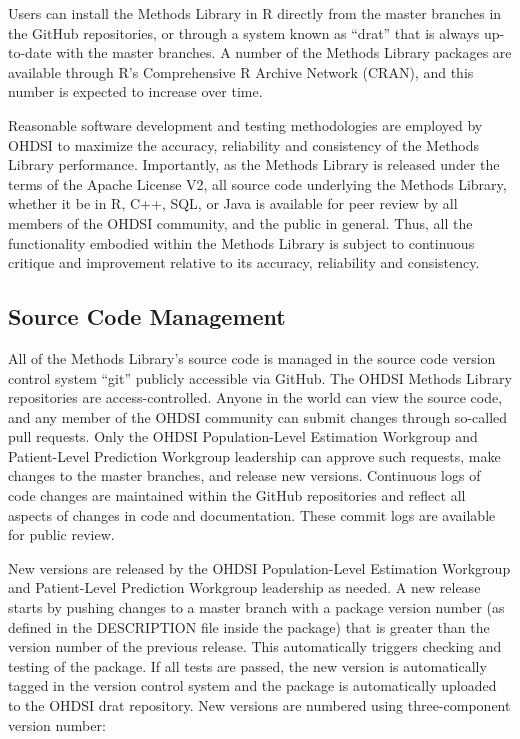 \documentclass[11pt]{book}
\theoremstyle{definition}
\theoremstyle{definition}
\theoremstyle{definition}
\theoremstyle{remark}
\begin{document}
Users can install the Methods Library in R directly from the master branches in the GitHub repositories, or through a system known as ``drat'' that is always up-to-date with the master branches. A number of the Methods Library packages are available through R's Comprehensive R Archive Network (CRAN), and this number is expected to increase over time.

Reasonable software development and testing methodologies are employed by OHDSI to maximize the accuracy, reliability and consistency of the Methods Library performance. Importantly, as the Methods Library is released under the terms of the Apache License V2, all source code underlying the Methods Library, whether it be in R, C++, SQL, or Java is available for peer review by all members of the OHDSI community, and the public in general. Thus, all the functionality embodied within the Methods Library is subject to continuous critique and improvement relative to its accuracy, reliability and consistency.

\hypertarget{source-code-management}{%
\subsection{Source Code Management}\label{source-code-management}}

All of the Methods Library's source code is managed in the source code version control system ``git'' publicly accessible via GitHub. The OHDSI Methods Library repositories are access-controlled. Anyone in the world can view the source code, and any member of the OHDSI community can submit changes through so-called pull requests. Only the OHDSI Population-Level Estimation Workgroup and Patient-Level Prediction Workgroup leadership can approve such requests, make changes to the master branches, and release new versions. Continuous logs of code changes are maintained within the GitHub repositories and reflect all aspects of changes in code and documentation. These commit logs are available for public review.

New versions are released by the OHDSI Population-Level Estimation Workgroup and Patient-Level Prediction Workgroup leadership as needed. A new release starts by pushing changes to a master branch with a package version number (as defined in the DESCRIPTION file inside the package) that is greater than the version number of the previous release. This automatically triggers checking and testing of the package. If all tests are passed, the new version is automatically tagged in the version control system and the package is automatically uploaded to the OHDSI drat repository. New versions are numbered using three-component version number:
\end{document}
